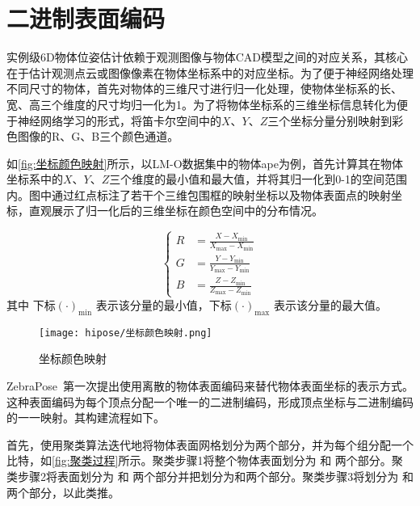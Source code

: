 \section{二进制表面编码}
\label{sec:hipose_encoding}

\par 实例级6D物体位姿估计依赖于观测图像与物体CAD模型之间的对应关系，其核心在于估计观测点云或图像像素在物体坐标系中的对应坐标。为了便于神经网络处理不同尺寸的物体，首先对物体的三维尺寸进行归一化处理，使物体坐标系的长、宽、高三个维度的尺寸均归一化为1。为了将物体坐标系的三维坐标信息转化为便于神经网络学习的形式，将笛卡尔空间中的$X$、$Y$、$Z$三个坐标分量分别映射到彩色图像的R、G、B三个颜色通道。

\par 如\autoref{fig:坐标颜色映射}所示，以LM-O数据集中的物体ape为例，首先计算其在物体坐标系中的$X$、$Y$、$Z$三个维度的最小值和最大值，并将其归一化到0-1的空间范围内。图中通过红点标注了若干个三维包围框的映射坐标以及物体表面点的映射坐标，直观展示了归一化后的三维坐标在颜色空间中的分布情况。

\begin{equation}
    \left\{
    \begin{aligned}
        R &= \frac{X - X_{\min}}{X_{\max} - X_{\min}} \\
        G &= \frac{Y - Y_{\min}}{Y_{\max} - Y_{\min}} \\
        B &= \frac{Z - Z_{\min}}{Z_{\max} - Z_{\min}}
    \end{aligned}
    \right.
\end{equation}
其中 下标$(\cdot)_{\min}$ 表示该分量的最小值，下标$(\cdot)_{\max}$ 表示该分量的最大值。

\begin{figure}[ht]
    \centering
    \texttt{[image: hipose/坐标颜色映射.png]}
    \caption{坐标颜色映射}
    \label{fig:坐标颜色映射}
\end{figure}

ZebraPose~\cite{su2022zebrapose}第一次提出使用离散的物体表面编码来替代物体表面坐标的表示方式。这种表面编码为每个顶点分配一个唯一的二进制编码，形成顶点坐标与二进制编码的一一映射。其构建流程如下。

首先，使用聚类算法迭代地将物体表面网格划分为两个部分，并为每个组分配一个比特，如\autoref{fig:聚类过程}所示。聚类步骤1将整个物体表面划分为  和 两个部分。聚类步骤2将表面划分为 和 两个部分并把划分为和两个部分。聚类步骤3将划分为  和 两个部分，以此类推。

